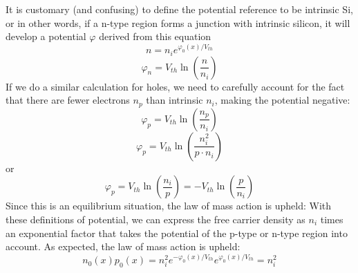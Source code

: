 It is customary (and confusing) to define the potential reference to be intrinsic Si, or in other words, if a n-type region forms a junction with intrinsic silicon, it will develop a potential $\varphi$ derived from this equation
\begin{equation} 
	{n} = {n_i}{e^{{\varphi _0}(x)/{V_{th}}}} 
\end{equation}
\begin{equation} 
	\varphi_n = V_{th} \ln\left( \frac{n}{n_i}  \right)
\end{equation}
If we do a similar calculation for holes, we need to carefully account for the fact that there are fewer electrons $n_p$ than intrinsic $n_i$, making the potential negative:
\begin{equation} 
	\varphi_p = V_{th} \ln\left( \frac{n_p}{n_i}  \right)
\end{equation}
\begin{equation} 
	\varphi_p = V_{th} \ln\left( \frac{n_i^2}{p \cdot n_i}  \right)
\end{equation}
or
\begin{equation} 
	\varphi_p = V_{th} \ln\left( \frac{n_i}{p}  \right) = - V_{th} \ln\left( \frac{p}{n_i}  \right) 
\end{equation}
Since this is an equilibrium situation, the law of mass action is upheld:
%
With these definitions of potential, we can express the free carrier density as $n_i$ times an exponential factor that takes the potential of the p-type or n-type region into account.  As expected, the law of mass action is upheld:
\begin{equation} 
	{n_0}(x){p_0}(x) = n_i^2{e^{ - {\varphi _0}(x)/{V_{th}}}}{e^{{\varphi _0}(x)/{V_{th}}}} = n_i^2 
\end{equation}
